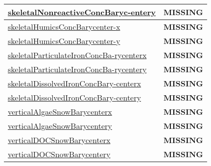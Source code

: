 {\begin{center}
\begin{longtable}{| p{2.0in} | p{4.0in} |}
    \hline
    \hyperref[subsec:var_sec_tracer_barycenter_skeletalNonreactiveConcBarycentery]{skeletalNonreactiveConcBaryc-}\hyperref[subsec:var_sec_tracer_barycenter_skeletalNonreactiveConcBarycentery]{entery  }& {\bf \color{red} MISSING} \\
    \hline
    \hyperref[subsec:var_sec_tracer_barycenter_skeletalHumicsConcBarycenterx]{skeletalHumicsConcBarycenter-}\hyperref[subsec:var_sec_tracer_barycenter_skeletalHumicsConcBarycenterx]{x  }& {\bf \color{red} MISSING} \\
    \hline
    \hyperref[subsec:var_sec_tracer_barycenter_skeletalHumicsConcBarycentery]{skeletalHumicsConcBarycenter-}\hyperref[subsec:var_sec_tracer_barycenter_skeletalHumicsConcBarycentery]{y  }& {\bf \color{red} MISSING} \\
    \hline
    \hyperref[subsec:var_sec_tracer_barycenter_skeletalParticulateIronConcBarycenterx]{skeletalParticulateIronConcBa-}\hyperref[subsec:var_sec_tracer_barycenter_skeletalParticulateIronConcBarycenterx]{rycenterx  }& {\bf \color{red} MISSING} \\
    \hline
    \hyperref[subsec:var_sec_tracer_barycenter_skeletalParticulateIronConcBarycentery]{skeletalParticulateIronConcBa-}\hyperref[subsec:var_sec_tracer_barycenter_skeletalParticulateIronConcBarycentery]{rycentery  }& {\bf \color{red} MISSING} \\
    \hline
    \hyperref[subsec:var_sec_tracer_barycenter_skeletalDissolvedIronConcBarycenterx]{skeletalDissolvedIronConcBary-}\hyperref[subsec:var_sec_tracer_barycenter_skeletalDissolvedIronConcBarycenterx]{centerx  }& {\bf \color{red} MISSING} \\
    \hline
    \hyperref[subsec:var_sec_tracer_barycenter_skeletalDissolvedIronConcBarycentery]{skeletalDissolvedIronConcBary-}\hyperref[subsec:var_sec_tracer_barycenter_skeletalDissolvedIronConcBarycentery]{centery  }& {\bf \color{red} MISSING} \\
    \hline
    \hyperref[subsec:var_sec_tracer_barycenter_verticalAlgaeSnowBarycenterx]{verticalAlgaeSnowBarycenterx} & {\bf \color{red} MISSING} \\
    \hline
    \hyperref[subsec:var_sec_tracer_barycenter_verticalAlgaeSnowBarycentery]{verticalAlgaeSnowBarycentery} & {\bf \color{red} MISSING} \\
    \hline
    \hyperref[subsec:var_sec_tracer_barycenter_verticalDOCSnowBarycenterx]{verticalDOCSnowBarycenterx} & {\bf \color{red} MISSING} \\
    \hline
    \hyperref[subsec:var_sec_tracer_barycenter_verticalDOCSnowBarycentery]{verticalDOCSnowBarycentery} & {\bf \color{red} MISSING} \\

\end{longtable}
\end{center}}
